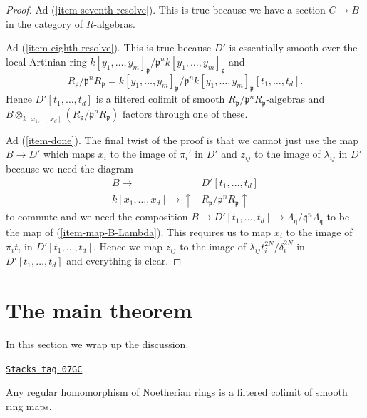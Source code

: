 \begin{proof}
\medskip\noindent
Ad (\ref{item-seventh-resolve}). This is true because we have a
section $C \to B$ in the category of $R$-algebras.

\medskip\noindent
Ad (\ref{item-eighth-resolve}). This is true because $D'$ is
essentially smooth over the local Artinian ring
$k[y_1, \ldots, y_m]_\mathfrak p/\mathfrak p^n k[y_1, \ldots, y_m]_\mathfrak p$
and
$$
R_\mathfrak p/\mathfrak p^nR_\mathfrak p =
k[y_1, \ldots, y_m]_\mathfrak p/
\mathfrak p^n k[y_1, \ldots, y_m]_\mathfrak p[t_1, \ldots, t_d].
$$
Hence $D'[t_1, \ldots, t_d]$ is a filtered colimit of smooth
$R_\mathfrak p/\mathfrak p^nR_\mathfrak p$-algebras and
$B \otimes_{k[x_1, \ldots, x_d]} (R_\mathfrak p/\mathfrak p^nR_\mathfrak p)$
factors through one of these.

\medskip\noindent
Ad (\ref{item-done}). The final twist of the proof is that we cannot
just use the map $B \to D'$ which maps $x_i$ to the image of $\pi_i'$
in $D'$ and $z_{ij}$ to the image of $\lambda_{ij}$ in $D'$
because we need the diagram
$$
\begin{array}{cc}B \longrightarrow & D'[t_1, \ldots, t_d] \\ k[x_1, \ldots, x_d] \longrightarrow\uparrow & R_\mathfrak p/\mathfrak p^nR_\mathfrak p \uparrow\end{array}
$$
to commute and we need the composition
$B \to D'[t_1, \ldots, t_d] \to
\Lambda_\mathfrak q/\mathfrak q^n\Lambda_\mathfrak q$
to be the map of (\ref{item-map-B-Lambda}).
This requires us to map $x_i$ to the image of
$\pi_i t_i$ in $D'[t_1, \ldots, t_d]$.
Hence we map $z_{ij}$ to the image of
$\lambda_{ij} t_i^{2N} / \delta_i^{2N}$ in $D'[t_1, \ldots, t_d]$
and everything is clear.
\end{proof}

\section{The main theorem}
\label{smoothing-section-main}
In this section we wrap up the discussion.

\begin{theorem}[Popescu]

\label{smoothing-theorem-popescu}
\href{https://stacks.math.columbia.edu/tag/07GC}{\texttt{Stacks tag 07GC}}

Any regular homomorphism of Noetherian rings is a filtered colimit
of smooth ring maps.
\end{theorem}

